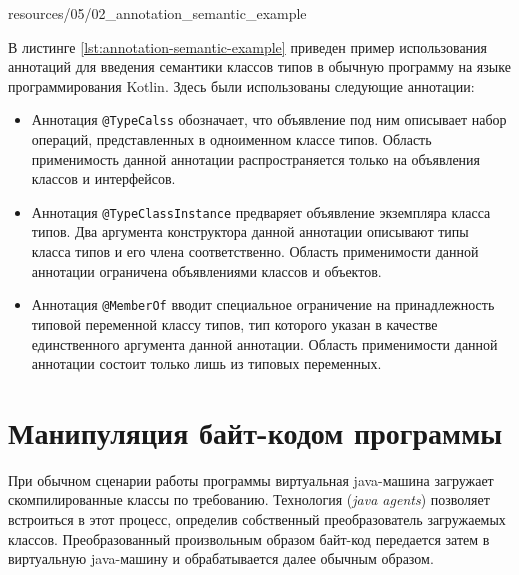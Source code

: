 
{resources/05/02_annotation_semantic_example}


В листинге \ref{lst:annotation-semantic-example} приведен пример использования аннотаций для введения семантики классов типов в обычную программу на языке программирования Kotlin. Здесь были использованы следующие аннотации:
\begin{itemize}
    \item Аннотация \lstinline{@TypeCalss} обозначает, что объявление под ним описывает набор операций, представленных в одноименном классе типов. Область применимость данной аннотации распространяется только на объявления классов и интерфейсов.
    \item Аннотация \lstinline{@TypeClassInstance} предваряет объявление экземпляра класса типов. Два аргумента конструктора данной аннотации описывают типы класса типов и его члена соответственно. Область применимости данной аннотации ограничена объявлениями классов и объектов.  
    \item Аннотация \lstinline{@MemberOf} вводит специальное ограничение на принадлежность типовой переменной классу типов, тип которого указан в качестве единственного аргумента данной аннотации. Область применимости данной аннотации состоит только лишь из типовых переменных.
\end{itemize}

\section{Манипуляция байт-кодом программы}

При обычном сценарии работы программы виртуальная java-машина загружает скомпилированные классы по требованию. Технология  (\emph{java agents}) позволяет встроиться в этот процесс, определив собственный преобразователь загружаемых классов. Преобразованный произвольным образом байт-код передается затем в виртуальную java-машину и обрабатывается далее обычным образом.  


